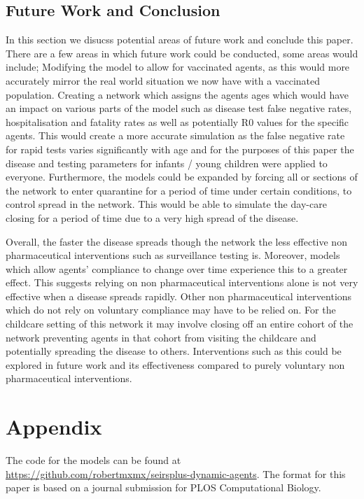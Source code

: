 \documentclass{article}
\begin{document}
\subsection{Future Work and Conclusion}
In this section we disucss potential areas of future work and conclude this paper. There are a few areas in which future work could be conducted, some areas would include; Modifying the model to allow for vaccinated agents, as this would more accurately mirror the real world situation we now have with a vaccinated population. Creating a network which assigns the agents ages which would have an impact on various parts of the model such as disease test false negative rates, hospitalisation and fatality rates as well as potentially R0 values for the specific agents. This would create a more accurate simulation as the false negative rate for rapid tests varies significantly with age and for the purposes of this paper the disease and testing parameters for infants / young children were applied to everyone. Furthermore, the models could be expanded by forcing all or sections of the network to enter quarantine for a period of time under certain conditions, to control spread in the network. This would be able to simulate the day-care closing for a period of time due to a very high spread of the disease. \newline 

Overall, the faster the disease spreads though the network the less effective non pharmaceutical interventions such as surveillance testing is. Moreover, models which allow agents’ compliance to change over time experience this to a greater effect. This suggests relying on non pharmaceutical  interventions alone is not very effective when a disease spreads rapidly. Other non pharmaceutical  interventions which do not rely on voluntary compliance may have to be relied on. For the childcare setting of this network it may involve closing off an entire cohort of the network preventing agents in that cohort from visiting the childcare and potentially spreading the disease to others. Interventions such as this could be explored in future work and its effectiveness compared to purely voluntary non pharmaceutical interventions.

\newpage

{}


\newpage
\appendix

\section{Appendix}
The code for the models can be found at \url{https://github.com/robertmxmx/seirsplus-dynamic-agents}.
The format for this paper is based on a journal submission for PLOS Computational Biology.
\end{document}
